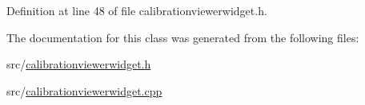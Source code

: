 Definition at line 48 of file calibrationviewerwidget.\+h.



The documentation for this class was generated from the following files\+:\begin{DoxyCompactItemize}
\item 
src/\mbox{\hyperlink{calibrationviewerwidget_8h}{calibrationviewerwidget.\+h}}\item 
src/\mbox{\hyperlink{calibrationviewerwidget_8cpp}{calibrationviewerwidget.\+cpp}}\end{DoxyCompactItemize}
